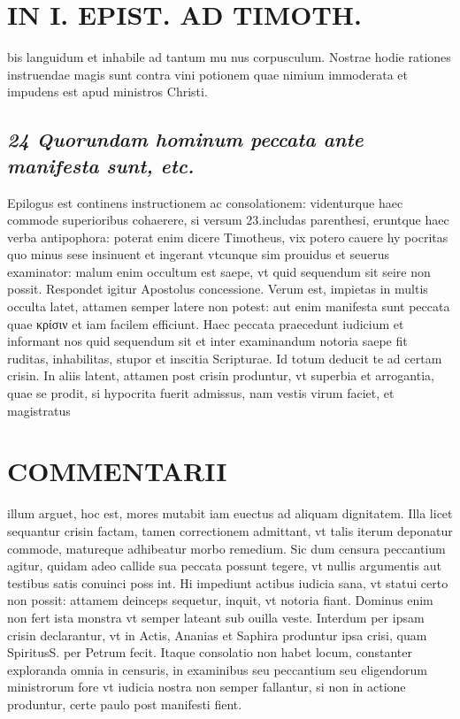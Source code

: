 \documentclass{article}
\begin{document}
\begin{pages}
\section*{IN I. EPIST. AD TIMOTH. }
\marginpar{[ p.141 ]}\pstart bis languidum et inhabile ad tantum mu nus corpusculum. Nostrae hodie rationes instruendae magis sunt contra vini potionem quae nimium immoderata et impudens est apud ministros Christi.  \pend
{}
{}
\subsection*{\textit{24 Quorundam hominum peccata ante manifesta sunt, etc. }}\pstart Epilogus est continens instructionem ac consolationem: videnturque haec commode superioribus cohaerere, si versum 23.includas parenthesi, eruntque haec verba antipophora: poterat enim dicere Timotheus, vix potero cauere hy pocritas quo minus sese insinuent et ingerant vtcunque sim prouidus et seuerus examinator: malum enim occultum est saepe, vt quid sequendum sit seire non possit. Respondet igitur Apostolus concessione. Verum est, impietas in multis occulta latet, attamen semper latere non potest: aut enim manifesta sunt peccata quae κρίσιν et iam facilem efficiunt.  \pend\pstart Haec peccata praecedunt iudicium et informant nos quid sequendum sit et inter examinandum notoria saepe fit ruditas, inhabilitas, stupor et inscitia Scripturae. Id totum deducit te ad certam crisin. In aliis latent, attamen post crisin produntur, vt superbia et arrogantia, quae se prodit, si hypocrita fuerit admissus, nam vestis virum faciet, et magistratus  \pend
\section*{COMMENTARII }
\marginpar{[ p.142 ]}\pstart illum arguet, hoc est, mores mutabit iam euectus ad aliquam dignitatem. Illa licet sequantur crisin factam, tamen correctionem admittant, vt talis iterum deponatur commode, matureque adhibeatur morbo remedium. Sic dum censura peccantium agitur, quidam adeo callide sua peccata possunt tegere, vt nullis argumentis aut testibus satis conuinci poss int. Hi impediunt actibus iudicia sana, vt statui certo non possit: attamem deinceps sequetur, inquit, vt notoria fiant. Dominus enim non fert ista monstra vt semper lateant sub ouilla veste. Interdum per ipsam crisin declarantur, vt in Actis, Ananias et Saphira produntur ipsa crisi, quam SpiritusS. per Petrum fecit. Itaque consolatio non habet locum, constanter exploranda omnia in censuris, in examinibus seu peccantium seu eligendorum ministrorum fore vt iudicia nostra non semper fallantur, si non in actione produntur, certe paulo post manifesti fient.  \pend
{}
{}

\end{pages}
\end{document}
